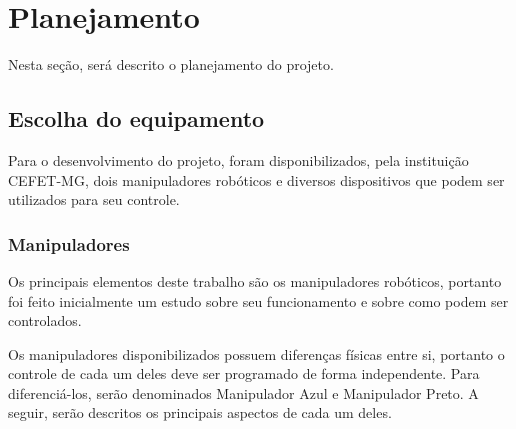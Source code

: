 \chapter[Planejamento]{Planejamento}
\label{cap:planejamento}

Nesta seção, será descrito o planejamento do projeto.

\section[Escolha do equipamento]{Escolha do equipamento}

Para o desenvolvimento do projeto, foram disponibilizados, pela instituição CEFET-MG, dois manipuladores robóticos e diversos dispositivos que podem ser utilizados para seu controle.

\subsection[Manipuladores]{Manipuladores}

Os principais elementos deste trabalho são os manipuladores robóticos, portanto foi feito inicialmente um estudo sobre seu funcionamento e sobre como podem ser controlados.

Os manipuladores disponibilizados possuem diferenças físicas entre si, portanto o controle de cada um deles deve ser programado de forma independente.
Para diferenciá-los, serão denominados Manipulador Azul e Manipulador Preto.
A seguir, serão descritos os principais aspectos de cada um deles.


